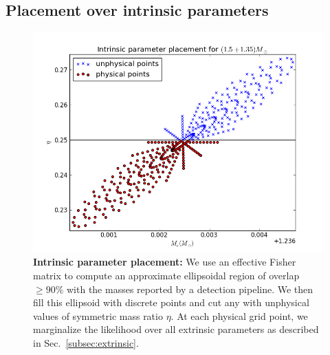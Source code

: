 
%


\subsection{Placement over intrinsic parameters}
\label{sec:itr_placement}

\begin{figure}
\includegraphics[width=\columnwidth]{../Figures/linear_ellipse_placement.png}
\caption{\label{fig:linear_ellipse} \textbf{Intrinsic parameter placement:} We use an effective Fisher matrix to compute
an approximate ellipsoidal region of overlap $\geq 90\%$ with the masses reported by a detection pipeline.
We then fill this ellipsoid with discrete points and cut any with unphysical values of symmetric mass ratio $\eta$.
At each physical grid point, we marginalize the likelihood over all extrinsic parameters as described in
Sec.~\ref{subsec:extrinsic}.}
\end{figure}

